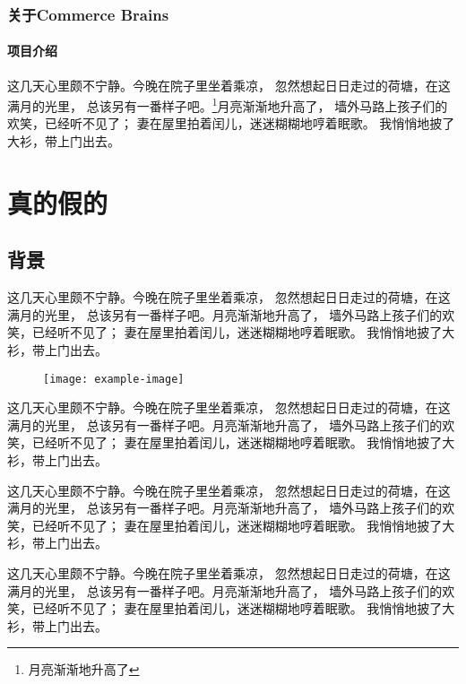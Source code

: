 \documentclass[printMode=false, declarePage=false]{ecnuthesis}
\begin{document}
\subsection{关于Commerce Brains}

\subsubsection{项目介绍}

这几天心里颇不宁静。今晚在院子里坐着乘凉，
忽然想起日日走过的荷塘，在这满月的光里，
总该另有一番样子吧。\footnote{月亮渐渐地升高了}月亮渐渐地升高了，
墙外马路上孩子们的欢笑，已经听不见了；
妻在屋里拍着闰儿，迷迷糊糊地哼着眠歌。
我悄悄地披了大衫，带上门出去。

\chapter{真的假的}

\section{背景}

这几天心里颇不宁静。今晚在院子里坐着乘凉，
忽然想起日日走过的荷塘，在这满月的光里，
总该另有一番样子吧。月亮渐渐地升高了，
墙外马路上孩子们的欢笑，已经听不见了；
妻在屋里拍着闰儿，迷迷糊糊地哼着眠歌。
我悄悄地披了大衫，带上门出去。

\begin{figure}[htb]
  \centering
  \texttt{[image: example-image]}
\end{figure}

这几天心里颇不宁静。今晚在院子里坐着乘凉，
忽然想起日日走过的荷塘，在这满月的光里，
总该另有一番样子吧。月亮渐渐地升高了，
墙外马路上孩子们的欢笑，已经听不见了；
妻在屋里拍着闰儿，迷迷糊糊地哼着眠歌。
我悄悄地披了大衫，带上门出去。

这几天心里颇不宁静。今晚在院子里坐着乘凉，
忽然想起日日走过的荷塘，在这满月的光里，
总该另有一番样子吧。月亮渐渐地升高了，
墙外马路上孩子们的欢笑，已经听不见了；
妻在屋里拍着闰儿，迷迷糊糊地哼着眠歌。
我悄悄地披了大衫，带上门出去。

这几天心里颇不宁静。今晚在院子里坐着乘凉，
忽然想起日日走过的荷塘，在这满月的光里，
总该另有一番样子吧。月亮渐渐地升高了，
墙外马路上孩子们的欢笑，已经听不见了；
妻在屋里拍着闰儿，迷迷糊糊地哼着眠歌。
我悄悄地披了大衫，带上门出去。
\end{document}
